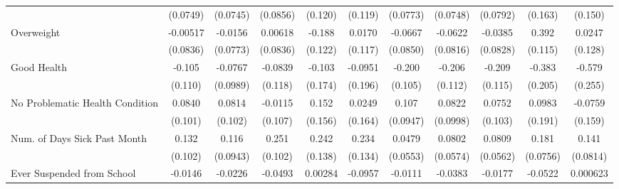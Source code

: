 {\begin{tabular}{l*{10}{c}}
            &    (0.0749)         &    (0.0745)         &    (0.0856)         &     (0.120)         &     (0.119)         &    (0.0773)         &    (0.0748)         &    (0.0792)         &     (0.163)         &     (0.150)         \\
\addlinespace
Overweight  &    -0.00517         &     -0.0156         &     0.00618         &      -0.188         &      0.0170         &     -0.0667         &     -0.0622         &     -0.0385         &       0.392\sym{***}&      0.0247         \\
            &    (0.0836)         &    (0.0773)         &    (0.0836)         &     (0.122)         &     (0.117)         &    (0.0850)         &    (0.0816)         &    (0.0828)         &     (0.115)         &     (0.128)         \\
\addlinespace
Good Health &      -0.105         &     -0.0767         &     -0.0839         &      -0.103         &     -0.0951         &      -0.200         &      -0.206         &      -0.209         &      -0.383         &      -0.579\sym{*}  \\
            &     (0.110)         &    (0.0989)         &     (0.118)         &     (0.174)         &     (0.196)         &     (0.105)         &     (0.112)         &     (0.115)         &     (0.205)         &     (0.255)         \\
\addlinespace
No Problematic Health Condition&      0.0840         &      0.0814         &     -0.0115         &       0.152         &      0.0249         &       0.107         &      0.0822         &      0.0752         &      0.0983         &     -0.0759         \\
            &     (0.101)         &     (0.102)         &     (0.107)         &     (0.156)         &     (0.164)         &    (0.0947)         &    (0.0998)         &     (0.103)         &     (0.191)         &     (0.159)         \\
\addlinespace
Num. of Days Sick Past Month&       0.132         &       0.116         &       0.251\sym{*}  &       0.242         &       0.234         &      0.0479         &      0.0802         &      0.0809         &       0.181\sym{*}  &       0.141         \\
            &     (0.102)         &    (0.0943)         &     (0.102)         &     (0.138)         &     (0.134)         &    (0.0553)         &    (0.0574)         &    (0.0562)         &    (0.0756)         &    (0.0814)         \\
\addlinespace
Ever Suspended from School&     -0.0146         &     -0.0226         &     -0.0493         &     0.00284         &     -0.0957         &     -0.0111         &     -0.0383         &     -0.0177         &     -0.0522         &    0.000623         \\

\end{tabular}}
